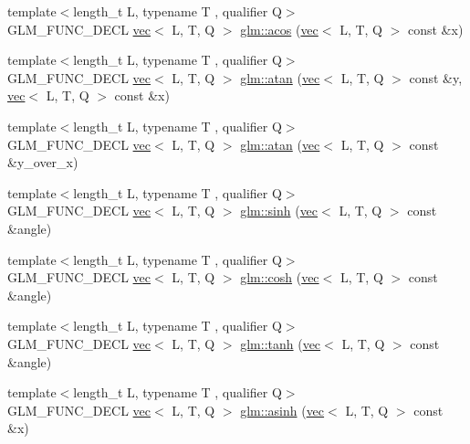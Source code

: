 \begin{DoxyCompactItemize}
\item 
{\footnotesize template$<$length\+\_\+t L, typename T , qualifier Q$>$ }\\G\+L\+M\+\_\+\+F\+U\+N\+C\+\_\+\+D\+E\+CL \hyperlink{structglm_1_1vec}{vec}$<$ L, T, Q $>$ \hyperlink{group__core__func__trigonometric_gacc9b092df8257c68f19c9053703e2563}{glm\+::acos} (\hyperlink{structglm_1_1vec}{vec}$<$ L, T, Q $>$ const \&x)
\item 
{\footnotesize template$<$length\+\_\+t L, typename T , qualifier Q$>$ }\\G\+L\+M\+\_\+\+F\+U\+N\+C\+\_\+\+D\+E\+CL \hyperlink{structglm_1_1vec}{vec}$<$ L, T, Q $>$ \hyperlink{group__core__func__trigonometric_gac61629f3a4aa14057e7a8cae002291db}{glm\+::atan} (\hyperlink{structglm_1_1vec}{vec}$<$ L, T, Q $>$ const \&y, \hyperlink{structglm_1_1vec}{vec}$<$ L, T, Q $>$ const \&x)
\item 
{\footnotesize template$<$length\+\_\+t L, typename T , qualifier Q$>$ }\\G\+L\+M\+\_\+\+F\+U\+N\+C\+\_\+\+D\+E\+CL \hyperlink{structglm_1_1vec}{vec}$<$ L, T, Q $>$ \hyperlink{group__core__func__trigonometric_ga5229f087eaccbc466f1c609ce3107b95}{glm\+::atan} (\hyperlink{structglm_1_1vec}{vec}$<$ L, T, Q $>$ const \&y\+\_\+over\+\_\+x)
\item 
{\footnotesize template$<$length\+\_\+t L, typename T , qualifier Q$>$ }\\G\+L\+M\+\_\+\+F\+U\+N\+C\+\_\+\+D\+E\+CL \hyperlink{structglm_1_1vec}{vec}$<$ L, T, Q $>$ \hyperlink{group__core__func__trigonometric_gac7c39ff21809e281552b4dbe46f4a39d}{glm\+::sinh} (\hyperlink{structglm_1_1vec}{vec}$<$ L, T, Q $>$ const \&angle)
\item 
{\footnotesize template$<$length\+\_\+t L, typename T , qualifier Q$>$ }\\G\+L\+M\+\_\+\+F\+U\+N\+C\+\_\+\+D\+E\+CL \hyperlink{structglm_1_1vec}{vec}$<$ L, T, Q $>$ \hyperlink{group__core__func__trigonometric_ga4e260e372742c5f517aca196cf1e62b3}{glm\+::cosh} (\hyperlink{structglm_1_1vec}{vec}$<$ L, T, Q $>$ const \&angle)
\item 
{\footnotesize template$<$length\+\_\+t L, typename T , qualifier Q$>$ }\\G\+L\+M\+\_\+\+F\+U\+N\+C\+\_\+\+D\+E\+CL \hyperlink{structglm_1_1vec}{vec}$<$ L, T, Q $>$ \hyperlink{group__core__func__trigonometric_gaa1bccbfdcbe40ed2ffcddc2aa8bfd0f1}{glm\+::tanh} (\hyperlink{structglm_1_1vec}{vec}$<$ L, T, Q $>$ const \&angle)
\item 
{\footnotesize template$<$length\+\_\+t L, typename T , qualifier Q$>$ }\\G\+L\+M\+\_\+\+F\+U\+N\+C\+\_\+\+D\+E\+CL \hyperlink{structglm_1_1vec}{vec}$<$ L, T, Q $>$ \hyperlink{group__core__func__trigonometric_ga3ef16b501ee859fddde88e22192a5950}{glm\+::asinh} (\hyperlink{structglm_1_1vec}{vec}$<$ L, T, Q $>$ const \&x)

\end{DoxyCompactItemize}
